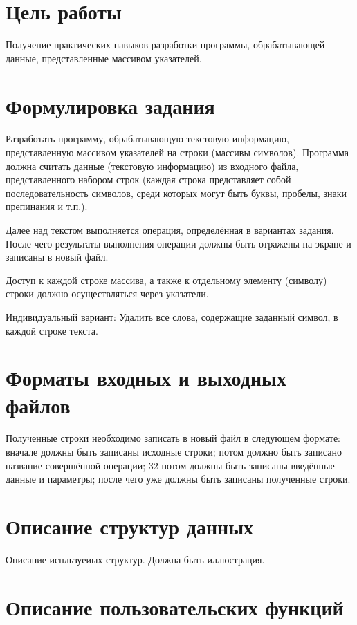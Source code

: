 \documentclass[12pt,a4paper]{article}  %
\begin{document}
	\section*{Цель работы}
	
	Получение
	практических
	навыков
	разработки
	программы,
	обрабатывающей данные, представленные массивом указателей.
	
	\section*{Формулировка задания}
	
	Разработать программу, обрабатывающую текстовую информацию,
	представленную массивом указателей на строки (массивы символов).
	Программа должна считать данные (текстовую информацию) из
	входного файла, представленного набором строк (каждая строка
	представляет собой последовательность символов, среди которых могут быть
	буквы, пробелы, знаки препинания и т.п.). 
	
	Далее над текстом выполняется
	операция, определённая в вариантах задания. После чего результаты
	выполнения операции должны быть отражены на экране и записаны в новый
	файл.
	
	Доступ к каждой строке массива, а также к отдельному элементу
	(символу) строки должно осуществляться через указатели.
	
	Индивидуальный вариант: Удалить все слова, содержащие заданный символ, в каждой строке текста.
	
	\section*{Форматы входных и выходных файлов}
	
	
	Полученные строки необходимо записать в новый файл в следующем
	формате:
	вначале должны быть записаны исходные строки;
	потом должно быть записано название совершённой операции;
	32 потом должны быть записаны введённые данные и параметры;
	после чего уже должны быть записаны полученные строки.
	
	\section*{Описание структур данных}
	
	Описание испльзуеиых структур. Должна быть иллюстрация.
	
	\section*{Описание пользовательских функций}
	
\end{document}
